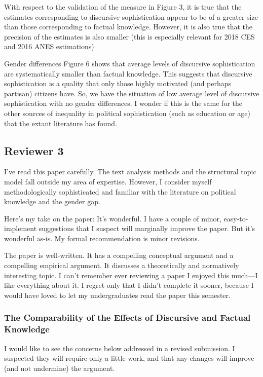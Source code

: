 With respect to the validation of the measure in Figure 3, it is true that the estimates corresponding to discursive sophistication appear to be of a greater size than those corresponding to factual knowledge. However, it is also true that the precision of the estimates is also smaller (this is especially relevant for 2018 CES and 2016 ANES estimations)

Gender differences Figure 6 shows that average levels of discursive sophistication are systematically smaller than factual knowledge. This suggests that discursive sophistication is a quality that only those highly motivated (and perhaps partisan) citizens have. So, we have the situation of low average level of discursive sophistication with no gender differences. I wonder if this is the same for the other sources of inequality in political sophistication (such as education or age) that the extant literature has found.


\subsection*{Reviewer 3}

I’ve read this paper carefully. The text analysis methods and the structural topic model fall outside my area of expertise. However, I consider myself methodologically sophisticated and familiar with the literature on political knowledge and the gender gap.

Here’s my take on the paper: It’s wonderful. I have a couple of minor, easy-to-implement suggestions that I suspect will marginally improve the paper. But it’s wonderful as-is. My formal recommendation is minor revisions.

The paper is well-written. It has a compelling conceptual argument and a compelling empirical argument. It discusses a theoretically and normatively interesting topic. I can’t remember ever reviewing a paper I enjoyed this much—I like everything about it. I regret only that I didn’t complete it sooner, because I would have loved to let my undergraduates read the paper this semester.

\subsubsection*{The Comparability of the Effects of Discursive and Factual Knowledge}

I would like to see the concerns below addressed in a revised submission. I suspected they will require only a little work, and that any changes will improve (and not undermine) the argument. 


